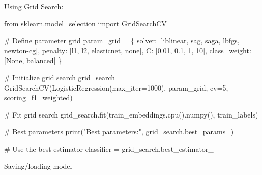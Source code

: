 \documentclass[
  letterpaper,
  DIV=11,
  numbers=noendperiod]{scrreprt}
\newenvironment{Shaded}{\begin{snugshade}}{\end{snugshade}}
\newcommand{\BuiltInTok}[1]{\textcolor[rgb]{0.00,0.23,0.31}{#1}}
\newcommand{\CommentTok}[1]{\textcolor[rgb]{0.37,0.37,0.37}{#1}}
\newcommand{\DecValTok}[1]{\textcolor[rgb]{0.68,0.00,0.00}{#1}}
\newcommand{\FloatTok}[1]{\textcolor[rgb]{0.68,0.00,0.00}{#1}}
\newcommand{\ImportTok}[1]{\textcolor[rgb]{0.00,0.46,0.62}{#1}}
\newcommand{\NormalTok}[1]{\textcolor[rgb]{0.00,0.23,0.31}{#1}}
\newcommand{\OperatorTok}[1]{\textcolor[rgb]{0.37,0.37,0.37}{#1}}
\newcommand{\StringTok}[1]{\textcolor[rgb]{0.13,0.47,0.30}{#1}}
\newcommand{\VariableTok}[1]{\textcolor[rgb]{0.07,0.07,0.07}{#1}}
\begin{document}
Using Grid Search:

\begin{Shaded}
\begin{Highlighting}[]
\ImportTok{from}\NormalTok{ sklearn.model\_selection }\ImportTok{import}\NormalTok{ GridSearchCV}

\CommentTok{\# Define parameter grid}
\NormalTok{param\_grid }\OperatorTok{=}\NormalTok{ \{}
    \StringTok{\textquotesingle{}solver\textquotesingle{}}\NormalTok{: [}\StringTok{\textquotesingle{}liblinear\textquotesingle{}}\NormalTok{, }\StringTok{\textquotesingle{}sag\textquotesingle{}}\NormalTok{, }\StringTok{\textquotesingle{}saga\textquotesingle{}}\NormalTok{, }\StringTok{\textquotesingle{}lbfgs\textquotesingle{}}\NormalTok{, }\StringTok{\textquotesingle{}newton{-}cg\textquotesingle{}}\NormalTok{],}
    \StringTok{\textquotesingle{}penalty\textquotesingle{}}\NormalTok{: [}\StringTok{\textquotesingle{}l1\textquotesingle{}}\NormalTok{, }\StringTok{\textquotesingle{}l2\textquotesingle{}}\NormalTok{, }\StringTok{\textquotesingle{}elasticnet\textquotesingle{}}\NormalTok{, }\StringTok{\textquotesingle{}none\textquotesingle{}}\NormalTok{],}
    \StringTok{\textquotesingle{}C\textquotesingle{}}\NormalTok{: [}\FloatTok{0.01}\NormalTok{, }\FloatTok{0.1}\NormalTok{, }\DecValTok{1}\NormalTok{, }\DecValTok{10}\NormalTok{],}
    \StringTok{\textquotesingle{}class\_weight\textquotesingle{}}\NormalTok{: [}\VariableTok{None}\NormalTok{, }\StringTok{\textquotesingle{}balanced\textquotesingle{}}\NormalTok{]}
\NormalTok{\}}

\CommentTok{\# Initialize grid search}
\NormalTok{grid\_search }\OperatorTok{=}\NormalTok{ GridSearchCV(LogisticRegression(max\_iter}\OperatorTok{=}\DecValTok{1000}\NormalTok{), param\_grid, cv}\OperatorTok{=}\DecValTok{5}\NormalTok{, scoring}\OperatorTok{=}\StringTok{\textquotesingle{}f1\_weighted\textquotesingle{}}\NormalTok{)}

\CommentTok{\# Fit grid search}
\NormalTok{grid\_search.fit(train\_embeddings.cpu().numpy(), train\_labels)}

\CommentTok{\# Best parameters}
\BuiltInTok{print}\NormalTok{(}\StringTok{"Best parameters:"}\NormalTok{, grid\_search.best\_params\_)}

\CommentTok{\# Use the best estimator}
\NormalTok{classifier }\OperatorTok{=}\NormalTok{ grid\_search.best\_estimator\_}
\end{Highlighting}
\end{Shaded}

Saving/loading model
\end{document}
